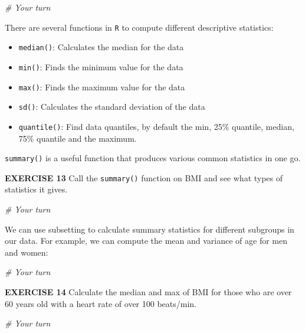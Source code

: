 \documentclass[
]{article}
\newenvironment{Shaded}{\begin{snugshade}}{\end{snugshade}}
\newcommand{\CommentTok}[1]{\textcolor[rgb]{0.56,0.35,0.01}{\textit{#1}}}
\providecommand{\tightlist}{%
  \setlength{\itemsep}{0pt}\setlength{\parskip}{0pt}}
\begin{document}
\begin{Shaded}
\begin{Highlighting}[]
\CommentTok{\# Your turn}
\end{Highlighting}
\end{Shaded}

There are several functions in \texttt{R} to compute different
descriptive statistics:

\begin{itemize}
\tightlist
\item
  \texttt{median()}: Calculates the median for the data
\item
  \texttt{min()}: Finds the minimum value for the data
\item
  \texttt{max()}: Finds the maximum value for the data
\item
  \texttt{sd()}: Calculates the standard deviation of the data
\item
  \texttt{quantile()}: Find data quantiles, by default the min, 25\%
  quantile, median, 75\% quantile and the maximum.
\end{itemize}

\texttt{summary()} is a useful function that produces various common
statistics in one go.

\textbf{EXERCISE 13} Call the \texttt{summary()} function on BMI and see
what types of statistics it gives.

\begin{Shaded}
\begin{Highlighting}[]
\CommentTok{\# Your turn}
\end{Highlighting}
\end{Shaded}

We can use subsetting to calculate summary statistics for different
subgroups in our data. For example, we can compute the mean and variance
of age for men and women:

\begin{Shaded}
\begin{Highlighting}[]
\CommentTok{\# Your turn}
\end{Highlighting}
\end{Shaded}

\textbf{EXERCISE 14} Calculate the median and max of BMI for those who
are over 60 years old with a heart rate of over 100 beats/min.

\begin{Shaded}
\begin{Highlighting}[]
\CommentTok{\# Your turn}
\end{Highlighting}
\end{Shaded}
\end{document}
